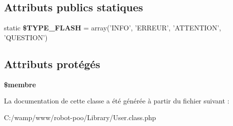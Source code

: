 \subsection*{Attributs publics statiques}
\begin{DoxyCompactItemize}
\item 
\hypertarget{class_library_1_1_user_a77e2464146e81cfa3e14bfae1def1002}{static {\bfseries \$\+T\+Y\+P\+E\+\_\+\+F\+L\+A\+S\+H} = array('I\+N\+F\+O', 'E\+R\+R\+E\+U\+R', 'A\+T\+T\+E\+N\+T\+I\+O\+N', 'Q\+U\+E\+S\+T\+I\+O\+N')}\label{class_library_1_1_user_a77e2464146e81cfa3e14bfae1def1002}

\end{DoxyCompactItemize}
\subsection*{Attributs protégés}
\begin{DoxyCompactItemize}
\item 
\hypertarget{class_library_1_1_user_aa000a46a528298c316b1fdf788402a63}{{\bfseries \$membre}}\label{class_library_1_1_user_aa000a46a528298c316b1fdf788402a63}

\end{DoxyCompactItemize}


La documentation de cette classe a été générée à partir du fichier suivant \+:\begin{DoxyCompactItemize}
\item 
C\+:/wamp/www/robot-\/poo/\+Library/User.\+class.\+php\end{DoxyCompactItemize}
